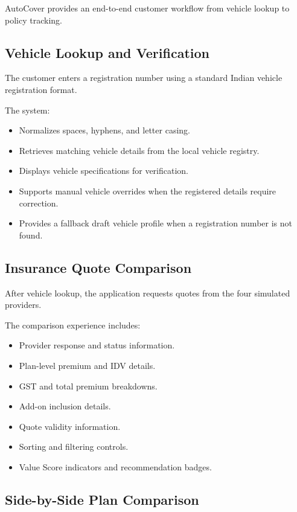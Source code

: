 \documentclass[11pt,a4paper]{article}
\begin{document}
AutoCover provides an end-to-end customer workflow from
vehicle lookup to policy tracking.

\subsection{Vehicle Lookup and Verification}

The customer enters a registration number using a standard
Indian vehicle registration format.

The system:

\begin{itemize}
    \item Normalizes spaces, hyphens, and letter casing.
    \item Retrieves matching vehicle details from the
    local vehicle registry.
    \item Displays vehicle specifications for verification.
    \item Supports manual vehicle overrides when the
    registered details require correction.
    \item Provides a fallback draft vehicle profile when
    a registration number is not found.
\end{itemize}

\subsection{Insurance Quote Comparison}

After vehicle lookup, the application requests quotes
from the four simulated providers.

The comparison experience includes:

\begin{itemize}
    \item Provider response and status information.
    \item Plan-level premium and IDV details.
    \item GST and total premium breakdowns.
    \item Add-on inclusion details.
    \item Quote validity information.
    \item Sorting and filtering controls.
    \item Value Score indicators and recommendation badges.
\end{itemize}

\subsection{Side-by-Side Plan Comparison}
\end{document}
